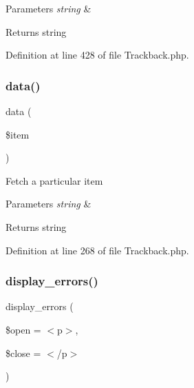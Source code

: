 \begin{DoxyParams}{Parameters}
{\em string} & \\
\hline
\end{DoxyParams}
\begin{DoxyReturn}{Returns}
string 
\end{DoxyReturn}


Definition at line 428 of file Trackback.\+php.

\mbox{\label{class_c_i___trackback_a4d04a7a984a4bcc71e27be87706f393c}} 
\subsubsection{\texorpdfstring{data()}{data()}}
{\footnotesize\ttfamily data (\begin{DoxyParamCaption}\item[{}]{\$item }\end{DoxyParamCaption})}

Fetch a particular item


\begin{DoxyParams}{Parameters}
{\em string} & \\
\hline
\end{DoxyParams}
\begin{DoxyReturn}{Returns}
string 
\end{DoxyReturn}


Definition at line 268 of file Trackback.\+php.

\mbox{\label{class_c_i___trackback_a71a6f2e6d97ff5347257f101002bc903}} 
\subsubsection{\texorpdfstring{display\_errors()}{display\_errors()}}
{\footnotesize\ttfamily display\+\_\+errors (\begin{DoxyParamCaption}\item[{}]{\$open = {\ttfamily \textquotesingle{}$<$p$>$\textquotesingle{}},  }\item[{}]{\$close = {\ttfamily \textquotesingle{}$<$/p$>$\textquotesingle{}} }\end{DoxyParamCaption})}

